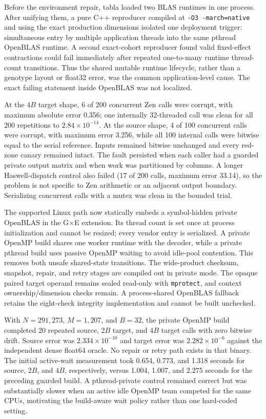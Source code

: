 \documentclass[11pt]{article}
\begin{document}
Before the environment repair, tabla loaded two BLAS runtimes in one process.
After unifying them, a pure C++ reproducer compiled at
\texttt{-O3 -march=native} and using the exact production dimensions isolated
one deployment trigger: simultaneous entry by multiple application threads
into the same pthread OpenBLAS runtime.  A second exact-cohort reproducer found
valid fixed-effect contractions could fail immediately after repeated
one-to-many runtime thread-count transitions.  Thus the shared mutable runtime
lifecycle, rather than a genotype layout or float32 error, was the common
application-level cause.  The exact failing statement inside OpenBLAS was not
localized.

At the 4$B$ target shape, 6 of 200 concurrent Zen calls were corrupt, with
maximum absolute error 0.356; one internally 32-threaded call was clean for all
200 repetitions to $2.84\times10^{-14}$.  At the source shape, 4 of 100
concurrent calls were corrupt, with maximum error 3.256, while all 100 internal
calls were bitwise equal to the serial reference.  Inputs remained bitwise
unchanged and every red-zone canary remained intact.  The fault persisted when
each caller had a guarded private output matrix and when work was partitioned
by columns.  A longer Haswell-dispatch control also failed (17 of 200 calls,
maximum error 33.14), so the problem is not specific to Zen arithmetic or an
adjacent output boundary.  Serializing concurrent calls with a mutex was clean
in the bounded trial.

The supported Linux path now statically embeds a symbol-hidden private
OpenBLAS in the G$\times$E extension.  Its thread count is set once at process
initialization and cannot be resized; every vendor entry is serialized.  A
private OpenMP build shares one worker runtime with the decoder, while a private
pthread build uses passive OpenMP waiting to avoid idle-pool contention.  This
removes both unsafe shared-state transitions.  The wide-product checksum,
snapshot, repair, and retry stages are compiled out in private mode.  The
opaque paired target operand remains sealed read-only with \texttt{mprotect},
and context ownership/dimension checks remain.  A process-shared OpenBLAS
fallback retains the eight-check integrity implementation and cannot be built
unchecked.

With $N=291{,}273$, $M=1{,}207$, and $B=32$, the private OpenMP build completed
20 repeated source, 2$B$ target, and 4$B$ target calls with zero bitwise drift.
Source error was $2.334\times10^{-10}$ and target error was
$2.282\times10^{-6}$ against the independent dense float64 oracle.  No repair
or retry path exists in that binary.  The initial active-wait measurement took
0.654, 0.773, and 1.318 seconds for source, 2$B$, and 4$B$, respectively,
versus 1.004, 1.007, and 2.275 seconds for the preceding guarded build.  A
pthread-private control remained correct but was substantially slower when an
active idle OpenMP team competed for the same CPUs, motivating the build-aware
wait policy rather than one hard-coded setting.
\end{document}

